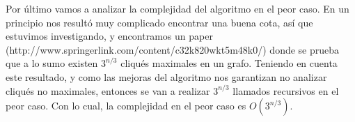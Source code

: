 Por último vamos a analizar la complejidad del algoritmo en el peor caso. En un principio nos resultó muy complicado encontrar una buena cota, así que estuvimos investigando, y encontramos un paper (http://www.springerlink.com/content/c32k820wkt5m48k0/) donde se prueba que a lo sumo existen $3^{n/3}$ cliqués maximales en un grafo. Teniendo en cuenta este resultado, y como las mejoras del algoritmo nos garantizan no analizar cliqués no maximales, entonces se van a realizar $3^{n/3}$ llamados recursivos en el peor caso. Con lo cual, la complejidad en el peor caso es $O(3^{n/3})$.
